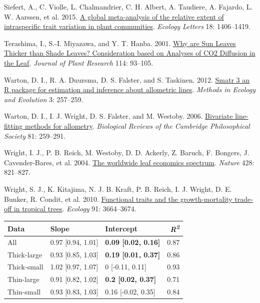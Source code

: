 \documentclass[
  12pt,
  a4paper,
,tablecaptionabove
]{scrartcl}
\newlength{\cslhangindent}
\newenvironment{CSLReferences}[2] %
 {%
  \setlength{\parindent}{0pt}
  \ifodd #1 \everypar{\setlength{\hangindent}{\cslhangindent}}\ignorespaces\fi
  \ifnum #2 > 0
  \setlength{\parskip}{#2\baselineskip}
  \fi
 }%
 {}
\begin{document}
\begin{CSLReferences}{1}{0}
\leavevmode{}%
Siefert, A., C. Violle, L. Chalmandrier, C. H. Albert, A. Taudiere, A.
Fajardo, L. W. Aarssen, et al. 2015.
\href{https://doi.org/10.1111/ele.12508}{A global meta-analysis of the
relative extent of intraspecific trait variation in plant communities}.
\emph{Ecology Letters} 18: 1406--1419.

\leavevmode{}%
Terashima, I., S.-I. Miyazawa, and Y. T. Hanba. 2001.
\href{https://doi.org/10.1007/PL00013972}{Why are {Sun Leaves Thicker}
than {Shade Leaves}? \textemdash{} {Consideration} based on {Analyses}
of {CO2 Diffusion} in the {Leaf}}. \emph{Journal of Plant Research} 114:
93--105.

\leavevmode{}%
Warton, D. I., R. A. Duursma, D. S. Falster, and S. Taskinen. 2012.
\href{https://doi.org/10.1111/j.2041-210X.2011.00153.x}{Smatr
3\textendash{} an {R} package for estimation and inference about
allometric lines}. \emph{Methods in Ecology and Evolution} 3: 257--259.

\leavevmode{}%
Warton, D. I., I. J. Wright, D. S. Falster, and M. Westoby. 2006.
\href{https://doi.org/10.1017/S1464793106007007}{Bivariate line-fitting
methods for allometry}. \emph{Biological Reviews of the Cambridge
Philosophical Society} 81: 259--291.

\leavevmode{}%
Wright, I. J., P. B. Reich, M. Westoby, D. D. Ackerly, Z. Baruch, F.
Bongers, J. Cavender-Bares, et al. 2004.
\href{https://doi.org/10.1038/nature02403}{The worldwide leaf economics
spectrum}. \emph{Nature} 428: 821--827.

\leavevmode{}%
Wright, S. J., K. Kitajima, N. J. B. Kraft, P. B. Reich, I. J. Wright,
D. E. Bunker, R. Condit, et al. 2010.
\href{https://doi.org/10.1890/09-2335.1}{Functional traits and the
growth-mortality trade-off in tropical trees}. \emph{Ecology} 91:
3664--3674.

\end{CSLReferences}

\newpage

\begin{longtable}[]{@{}lllr@{}}
\toprule
Data & Slope & Intercept & \emph{R\textsuperscript{2}} \\
\midrule
\endhead
All & 0.97 {[}0.94, 1.01{]} & \textbf{0.09 {[}0.02, 0.16{]}} & 0.87 \\
Thick-large & 0.93 {[}0.85, 1.03{]} & \textbf{0.19 {[}0.01, 0.37{]}} &
0.86 \\
Thick-small & 1.02 {[}0.97, 1.07{]} & 0 {[}-0.11, 0.11{]} & 0.93 \\
Thin-large & 0.91 {[}0.82, 1.02{]} & \textbf{0.2 {[}0.02, 0.37{]}} &
0.71 \\
Thin-small & 0.93 {[}0.83, 1.03{]} & 0.16 {[}-0.02, 0.35{]} & 0.84 \\
\bottomrule
\end{longtable}
\end{document}
